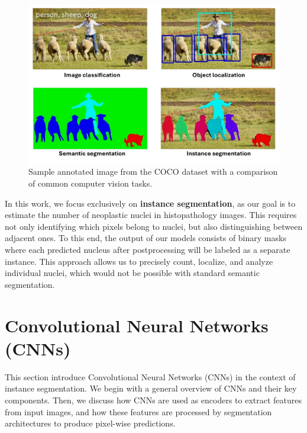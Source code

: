 \documentclass[target=bach,aauheader=,style=]{thud}
\begin{document}
\begin{figure}[h]
    \centering
    \includegraphics[width=0.75\linewidth]{imgs/Instance segmentation.jpg}
    \caption{Sample annotated image from the COCO \cite{lin2015microsoftcococommonobjects} dataset with a comparison of common computer vision tasks.}
    \label{fig:semantic}
\end{figure}

In this work, we focus exclusively on \textbf{instance segmentation}, as our goal is to estimate the number of neoplastic nuclei in histopathology images. This requires not only identifying which pixels belong to nuclei, but also distinguishing between adjacent ones. To this end, the output of our models consists of binary masks where each predicted nucleus after postprocessing will be labeled as a separate instance. This approach allows us to precisely count, localize, and analyze individual nuclei, which would not be possible with standard semantic segmentation.
\section{Convolutional Neural Networks (CNNs)}
This section introduce Convolutional Neural Networks (CNNs) in the context of instance segmentation. We begin with a general overview of CNNs and their key components. Then, we discuss how CNNs are used as encoders to extract features from input images, and how these features are processed by segmentation architectures to produce pixel-wise predictions.
\end{document}
